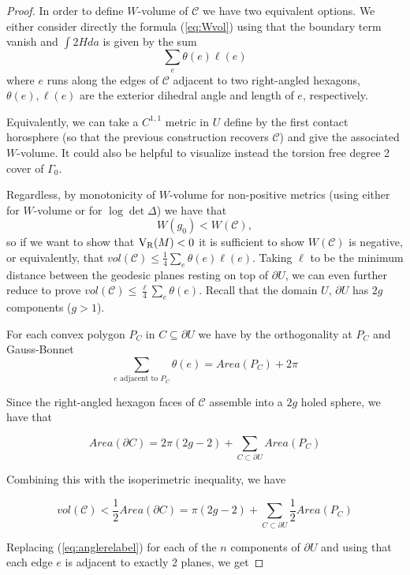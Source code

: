 \documentclass[12pt]{amsart}
\newcommand{\VR}{{\rm V}_{\rm R}}
\begin{document}
\begin{proof}
In order to define $W$-volume of $\mathcal{C}$ we have two equivalent options. We either consider directly the formula (\ref{eq:Wvol}) using that the boundary term vanish and $\int 2Hda$ is given by the sum 
\[\sum_e \theta(e)\ell(e)
\]
where $e$ runs along the edges of $\mathcal{C}$ adjacent to two right-angled hexagons, $\theta(e),\ell(e)$ are the exterior dihedral angle and length of $e$, respectively.

Equivalently, we can take a $C^{1,1}$ metric in $U$ define by the first contact horosphere (so that the previous construction recovers $\mathcal{C}$) and give the associated $W$-volume. It could also be helpful to visualize instead the torsion free degree 2 cover of $\Gamma_0$.

Regardless, by monotonicity of $W$-volume for non-positive metrics (using either \cite[Proposition 3.11]{Schlenker} for $W$-volume or \cite[Equation 1.17]{OsgoodPhillipsSarnak} for $\log\det\Delta$) we have that
\[W(g_0) < W(\mathcal{C}),
\]
so if we want to show that $\VR(M)<0$ it is sufficient to show $W(\mathcal{C})$ is negative, or equivalently, that $vol(\mathcal{C})\leq \frac14\sum_e \theta(e)\ell(e)$. Taking $\ell$ to be the minimum distance between the geodesic planes resting on top of $\partial U$, we can even further reduce to prove $vol(\mathcal{C})\leq \frac\ell4\sum_e \theta(e)$. Recall that the domain $U$, $\partial U$ has $2g$ components ($g>1$).

For each convex polygon $P_C$ in $C\subseteq \partial U$ we have by the orthogonality at $P_C$ and Gauss-Bonnet
\begin{equation}\label{eq:anglerelabel}
    \sum_{e \text{ adjacent to } P_C} \theta(e) = Area(P_C)+2\pi
\end{equation}

Since the right-angled hexagon faces of $\mathcal{C}$ assemble into a $2g$ holed sphere, we have that

\begin{equation}
    Area(\partial C) = 2\pi(2g-2) + \sum_{C\subset\partial U} Area(P_C)
\end{equation}

Combining this with the isoperimetric inequality, we have

\begin{equation}
    vol(\mathcal{C}) < \frac12Area(\partial C) = \pi(2g-2) + \sum_{C\subset\partial U} \frac12 Area(P_C)
\end{equation}

Replacing (\ref{eq:anglerelabel}) for each of the $n$ components of $\partial U$ and using that each edge $e$ is adjacent to exactly 2 planes, we get


\end{proof}
\end{document}
